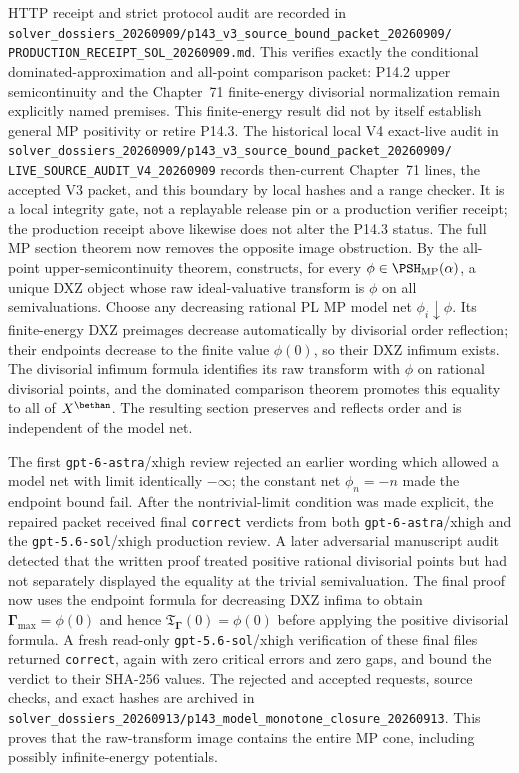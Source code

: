 HTTP receipt and strict protocol audit are recorded in
\nolinkurl{solver_dossiers_20260909/p143_v3_source_bound_packet_20260909/}
\nolinkurl{PRODUCTION_RECEIPT_SOL_20260909.md}.  This verifies exactly the
conditional dominated-approximation and all-point comparison packet:
P14.2 upper semicontinuity and the Chapter~71 finite-energy divisorial
normalization remain explicitly named premises.  This finite-energy result
did not by itself establish general MP positivity or retire P14.3.
The historical local V4 exact-live audit in
\nolinkurl{solver_dossiers_20260909/p143_v3_source_bound_packet_20260909/}
\nolinkurl{LIVE_SOURCE_AUDIT_V4_20260909} records then-current Chapter~71
lines, the accepted V3 packet, and this boundary by local hashes and a range
checker.  It is a local integrity gate, not a replayable release pin or a
production verifier receipt; the production receipt above likewise does not
alter the P14.3 status.
The full MP section theorem now removes the opposite image obstruction.
By the all-point upper-semicontinuity theorem,
 constructs, for every
\(\phi\in\PSH_{\mathrm{MP}}(\alpha)\), a unique DXZ object whose raw
ideal-valuative transform is \(\phi\) on all semivaluations.  Choose any
decreasing rational PL MP model net \(\phi_i\downarrow\phi\).  Its
finite-energy DXZ preimages decrease automatically by divisorial order
reflection; their endpoints decrease to the finite value \(\phi(0)\), so
their DXZ infimum exists.  The divisorial infimum formula identifies its raw
transform with \(\phi\) on rational divisorial points, and the dominated
comparison theorem promotes this equality to all of \(X^{\bethan}\).  The
resulting section preserves and reflects order and is independent of the
model net.

The first \texttt{gpt-6-astra}/xhigh review rejected an earlier wording
which allowed a model net with limit identically \(-\infty\); the constant
net \(\phi_n=-n\) made the endpoint bound fail.  After the nontrivial-limit
condition was made explicit, the repaired packet received final
\texttt{correct} verdicts from both \texttt{gpt-6-astra}/xhigh and the
\texttt{gpt-5.6-sol}/xhigh production review.  A later adversarial manuscript
audit detected that the written proof treated positive rational divisorial
points but had not separately displayed the equality at the trivial
semivaluation.  The final proof now uses the endpoint formula for decreasing
DXZ infima to obtain
\(\boldsymbol\Gamma_{\max}=\phi(0)\) and hence
\(\mathfrak T_{\boldsymbol\Gamma}(0)=\phi(0)\) before applying the positive
divisorial formula.  A fresh read-only
\texttt{gpt-5.6-sol}/xhigh verification of these final files returned
\texttt{correct}, again with zero critical errors and zero gaps, and bound
the verdict to their SHA-256 values.  The rejected and accepted requests,
source checks, and exact hashes are archived in
\nolinkurl{solver_dossiers_20260913/p143_model_monotone_closure_20260913}.
This proves that the raw-transform image contains the entire MP cone,
including possibly infinite-energy potentials.

